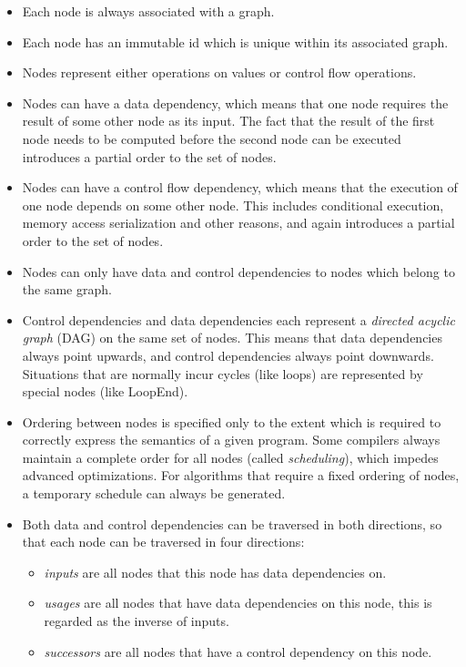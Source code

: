 \documentclass[twocolumn]{svjour3}
\begin{document}
\begin{itemize}
    \item Each node is always associated with a graph.
    \item Each node has an immutable id which is unique within its associated graph.
    \item Nodes represent either operations on values or control flow operations.
    \item Nodes can have a data dependency, which means that one node requires the result of some other node as its input. The fact that the result of the first node needs to be computed before the second node can be executed introduces a partial order to the set of nodes.
    \item Nodes can have a control flow dependency, which means that the execution of one node depends on some other node. This includes conditional execution, memory access serialization and other reasons, and again introduces a partial order to the set of nodes.
    \item Nodes can only have data and control dependencies to nodes which belong to the same graph.
    \item Control dependencies and data dependencies each represent a \emph{directed acyclic graph} (DAG) on the same set of nodes. This means that data dependencies always point upwards, and control dependencies always point downwards. Situations that are normally incur cycles (like loops) are represented by special nodes (like LoopEnd).
	\item Ordering between nodes is specified only to the extent which is required to correctly express the semantics of a given program. Some compilers always maintain a complete order for all nodes (called \emph{scheduling}), which impedes advanced optimizations. For algorithms that require a fixed ordering of nodes, a temporary schedule can always be generated.
    \item Both data and control dependencies can be traversed in both directions, so that each node can be traversed in four directions:
    \begin{itemize}
        \item \emph{inputs} are all nodes that this node has data dependencies on.
        \item \emph{usages} are all nodes that have data dependencies on this node, this is regarded as the inverse of inputs.
        \item \emph{successors} are all nodes that have a control dependency on this node.

\end{itemize}
\end{itemize}
\end{document}
